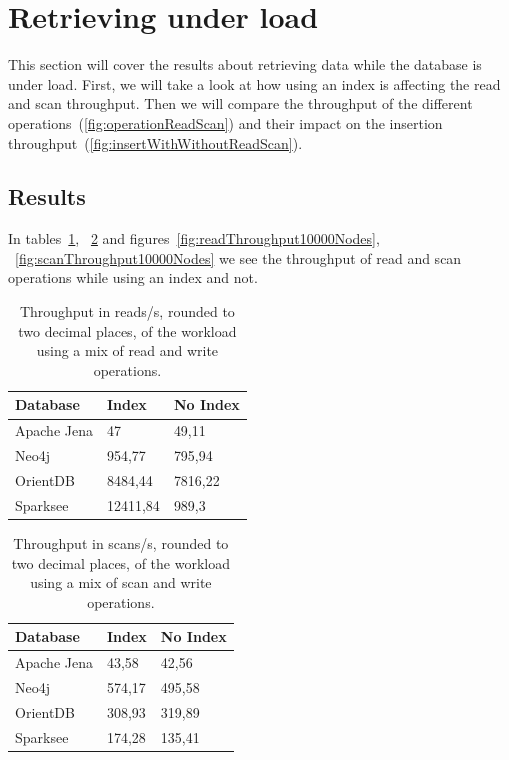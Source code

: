\section{Retrieving under load}
\label{ch:evaluation:se:retrievingUnderLoad}
This section will cover the results about retrieving data while the database is under load.
First,
we will take a look at how using an index is affecting the read and scan throughput.
Then we will compare the throughput of the different operations~(\ref{fig:operationReadScan}) and their impact on the insertion throughput~(\ref{fig:insertWithWithoutReadScan}).

\subsection{Results}
In tables~\ref{tab:readThroughput10000Nodes},
~\ref{tab:scanThroughput10000Nodes} and figures~\ref{fig:readThroughput10000Nodes},
~\ref{fig:scanThroughput10000Nodes} we see the throughput of read and scan operations while using an index and not.

\begin{table}[h!]
  \begin{minipage}{\textwidth}
    \centering
    \begin{tabular}{ | l | l | l | }
      \hline
      Database & Index & No Index \\ \hline
      Apache Jena & 47 & 49,11 \\ \hline
      Neo4j & 954,77 & 795,94 \\ \hline
      OrientDB & 8484,44 & 7816,22 \\ \hline
      Sparksee & 12411,84 & 989,3 \\ \hline
    \end{tabular}
  \end{minipage}
  \caption{Throughput in reads/s, rounded to two decimal places, of the workload using a mix of read and write operations.}
  \label{tab:readThroughput10000Nodes}
\end{table}

\begin{table}[h!]
  \begin{minipage}{\textwidth}
    \centering
    \begin{tabular}{ | l | l | l | }
      \hline
      Database & Index & No Index \\ \hline
      Apache Jena & 43,58 & 42,56 \\ \hline
      Neo4j & 574,17 & 495,58 \\ \hline
      OrientDB & 308,93 & 319,89 \\ \hline
      Sparksee & 174,28 & 135,41 \\ \hline
    \end{tabular}
  \end{minipage}
  \caption{Throughput in scans/s, rounded to two decimal places, of the workload using a mix of scan and write operations.}
  \label{tab:scanThroughput10000Nodes}
\end{table}

